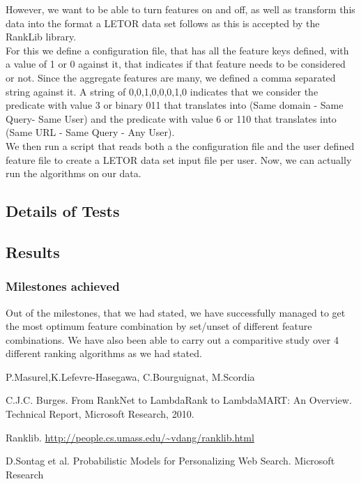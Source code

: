 \documentclass[11pt,letterpaper]{article}
\begin{document}
However, we want to be able to turn features on and off, as well as transform this data into the format a LETOR data set follows as this is accepted by the RankLib library.\\
For this we define a configuration file, that has all the feature keys defined, with a value of 1 or 0 against it, that indicates if that feature needs to be considered or not. Since the aggregate features are many, we defined a comma separated string against it. A string of 0,0,1,0,0,0,1,0 indicates that we consider the predicate with value 3 or binary 011 that translates into (Same domain - Same Query- Same User)  and the predicate with value 6 or 110 that translates into (Same URL - Same Query - Any User). \\ 
We then run a script that reads both a the configuration file and the user defined feature file to create a LETOR data set input file per user. Now, we can actually run the algorithms on our data.
\subsection{Details of Tests}



\subsection{Results}




\subsubsection*{Milestones achieved}
Out of the milestones, that we had stated, we have successfully managed to get the most optimum feature combination by set/unset of different feature combinations. We have also been able to carry out a comparitive study over 4 different ranking algorithms as we had stated. %

\begin{thebibliography}{}


\bibitem[1] P.Masurel,K.Lefevre-Hasegawa, C.Bourguignat, M.Scordia 


\bibitem[2] C.J.C. Burges. From RankNet to LambdaRank to
LambdaMART: An Overview. Technical Report, Microsoft Research, 2010.

\bibitem[3] Ranklib.
\url{http://people.cs.umass.edu/~vdang/ranklib.html}

\bibitem[4] D.Sontag et al. Probabilistic Models for Personalizing Web Search.
Microsoft Research


\end{thebibliography}
\end{document}
